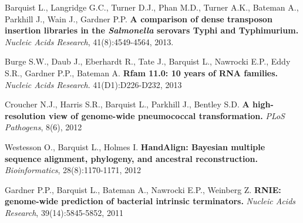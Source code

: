 \item{Barquist L., Langridge G.C., Turner D.J., Phan M.D., Turner A.K., Bateman A., Parkhill J., Wain J., Gardner P.P. \textbf{A comparison of dense transposon insertion libraries in the \textit{Salmonella} serovars Typhi and Typhimurium.} \textit{Nucleic Acids Research}, 41(8):4549-4564, 2013.} 

\item{Burge S.W., Daub J., Eberhardt R., Tate J., Barquist L., Nawrocki E.P., Eddy S.R., Gardner P.P., Bateman A. \textbf{Rfam 11.0: 10 years of RNA families.} \textit{Nucleic Acids Research}. 41(D1):D226-D232, 2013}

\item{Croucher N.J., Harris S.R., Barquist L., Parkhill J., Bentley S.D. \textbf{A high-resolution view of genome-wide pneumococcal transformation.} \textit{PLoS Pathogens}, 8(6), 2012}

\item{Westesson O., Barquist L., Holmes I. \textbf{HandAlign: Bayesian multiple sequence alignment, phylogeny, and ancestral reconstruction.} \textit{Bioinformatics}, 28(8):1170-1171, 2012}

\item{Gardner P.P., Barquist L., Bateman A., Nawrocki E.P., Weinberg Z. \textbf{RNIE: genome-wide prediction of bacterial intrinsic terminators.} \textit{Nucleic Acids Research}, 39(14):5845-5852, 2011}



 


